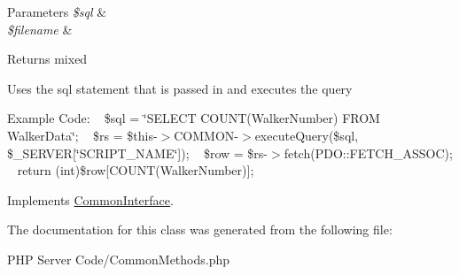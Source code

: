 \begin{DoxyParams}{Parameters}
{\em \$sql} & \\
\hline
{\em \$filename} & \\
\hline
\end{DoxyParams}
\begin{DoxyReturn}{Returns}
mixed
\end{DoxyReturn}
Uses the sql statement that is passed in and executes the query

Example Code\+: ~\newline
 \$sql = \char`\"{}\+S\+E\+L\+E\+C\+T C\+O\+U\+N\+T(\+Walker\+Number) F\+R\+O\+M Walker\+Data\char`\"{}; ~\newline
 \$rs = \$this-\/$>$C\+O\+M\+M\+O\+N-\/$>$execute\+Query(\$sql, \$\+\_\+\+S\+E\+R\+V\+ER\mbox{[}\char`\"{}\+S\+C\+R\+I\+P\+T\+\_\+\+N\+A\+M\+E\char`\"{}\mbox{]}); ~\newline
 \$row = \$rs-\/$>$fetch(\+P\+D\+O\+::\+F\+E\+T\+C\+H\+\_\+\+A\+S\+S\+O\+C); ~\newline
 return (int)\$row\mbox{[}\textquotesingle{}C\+O\+U\+N\+T(\+Walker\+Number)\textquotesingle{}\mbox{]}; ~\newline
 

Implements \hyperlink{interface_common_interface_a57a9dbd1203cf7b3ef3c5ce40d4047cc}{Common\+Interface}.



The documentation for this class was generated from the following file\+:\begin{DoxyCompactItemize}
\item 
P\+H\+P Server Code/Common\+Methods.\+php\end{DoxyCompactItemize}
